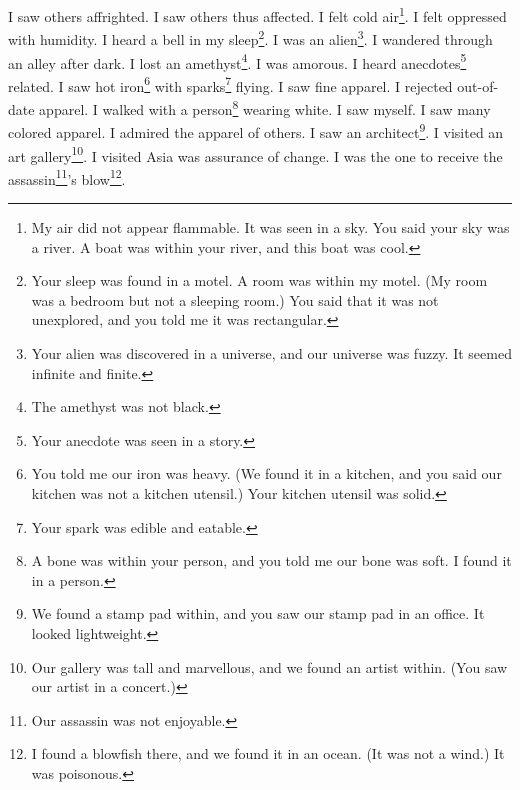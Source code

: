 \documentclass[12pt]{book}
\begin{document}
 I saw others affrighted. I saw others thus affected. I felt cold air\footnote{My air did not appear flammable. It was seen in a sky. You said your sky was a river. A boat was within your river, and this boat was cool.}. I felt oppressed with humidity. I heard a bell in my sleep\footnote{Your sleep was found in a motel. A room was within my motel. (My room was a bedroom but not a sleeping room.) You said that it was not unexplored, and you told me it was rectangular.}. I was an alien\footnote{Your alien was discovered in a universe, and our universe was fuzzy. It seemed infinite and finite.}. I wandered through an alley after dark. I lost an amethyst\footnote{The amethyst was not black.}. I was amorous. I heard anecdotes\footnote{Your anecdote was seen in a story.} related. I saw hot iron\footnote{You told me our iron was heavy. (We found it in a kitchen, and you said our kitchen was not a kitchen utensil.) Your kitchen utensil was solid.} with sparks\footnote{Your spark was edible and eatable.} flying. I saw fine apparel. I rejected out-of-date apparel. I walked with a person\footnote{A bone was within your person, and you told me our bone was soft. I found it in a person.} wearing white. I saw myself. I saw many colored apparel. I admired the apparel of others. I saw an architect\footnote{We found a stamp pad within, and you saw our stamp pad in an office. It looked lightweight.}. I visited an art gallery\footnote{Our gallery was tall and marvellous, and we found an artist within. (You saw our artist in a concert.)}. I visited Asia was assurance of change. I was the one to receive the assassin\footnote{Our assassin was not enjoyable.}'s blow\footnote{I found a blowfish there, and we found it in an ocean. (It was not a wind.) It was poisonous.}. 
\end{document}
